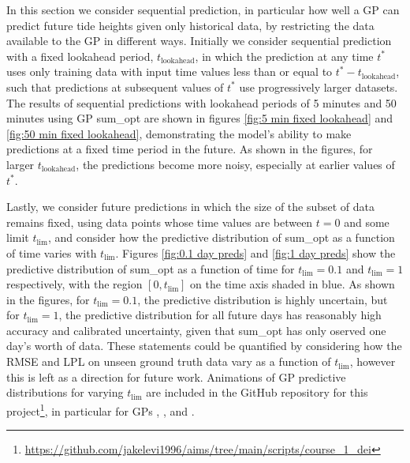 In this section we consider sequential prediction, in particular how well a GP can predict future tide heights given only historical data, by restricting the data available to the GP in different ways. Initially we consider sequential prediction with a fixed lookahead period, $t_{\text{lookahead}}$, in which the prediction at any time $t^*$ uses only training data with input time values less than or equal to $t^* - t_{\text{lookahead}}$, such that predictions at subsequent values of $t^*$ use progressively larger datasets. The results of sequential predictions with lookahead periods of 5 minutes and 50 minutes using GP sum\_opt are shown in figures \ref{fig:5 min fixed lookahead} and \ref{fig:50 min fixed lookahead}, demonstrating the model's ability to make predictions at a fixed time period in the future. As shown in the figures, for larger $t_{\text{lookahead}}$, the predictions become more noisy, especially at earlier values of $t^*$.

Lastly, we consider future predictions in which the size of the subset of data remains fixed, using data points whose time values are between $t=0$ and some limit $t_\text{lim}$, and consider how the predictive distribution of sum\_opt as a function of time varies with $t_\text{lim}$. Figures \ref{fig:0.1 day preds} and \ref{fig:1 day preds} show the predictive distribution of sum\_opt as a function of time for $t_\text{lim}=0.1$ and $t_\text{lim}=1$ respectively, with the region $\left[0, t_\text{lim}\right]$ on the time axis shaded in blue. As shown in the figures, for $t_\text{lim}=0.1$, the predictive distribution is highly uncertain, but for $t_\text{lim}=1$, the predictive distribution for all future days has reasonably high accuracy and calibrated uncertainty, given that sum\_opt has only oserved one day's worth of data. These statements could be quantified by considering how the RMSE and LPL on unseen ground truth data vary as a function of  $t_\text{lim}$, however this is left as a direction for future work. Animations of GP predictive distributions for varying $t_\text{lim}$ are included in the GitHub repository for this project\footnote{\url{https://github.com/jakelevi1996/aims/tree/main/scripts/course_1_dei}}, in particular for GPs \href{https://github.com/jakelevi1996/aims/blob/main/scripts/course_1_dei/Results/Protected/sequential_predictions_sqe_opt.gif}{\color{blue}{sqe\_opt}}, \href{https://github.com/jakelevi1996/aims/blob/main/scripts/course_1_dei/Results/Protected/sequential_predictions_prod_opt.gif}{\color{blue}{prod\_opt}}, and \href{https://github.com/jakelevi1996/aims/blob/main/scripts/course_1_dei/Results/Protected/sequential_predictions_sum_opt.gif}{\color{blue}{sum\_opt}}.
